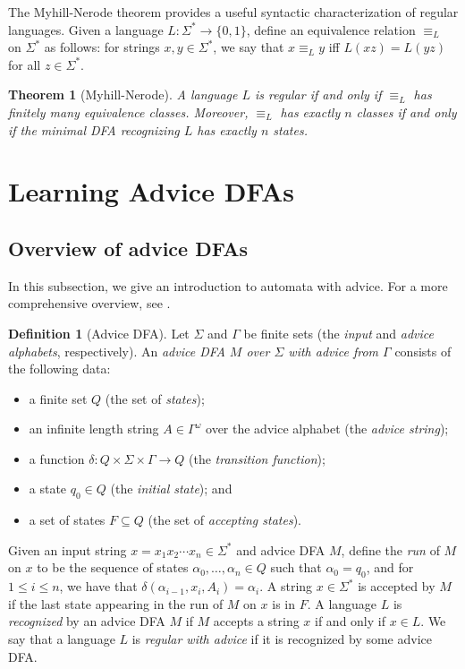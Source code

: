 \documentclass[11pt,a4paper]{amsart}
\newtheorem{theorem}{Theorem}
\theoremstyle{definition}
\newtheorem{definition}{Definition}
\begin{document}
The Myhill-Nerode theorem provides a useful syntactic characterization of regular languages.
Given a language $L : \Sigma^* \to \{0,1\}$, define an equivalence relation $\equiv_L$ on $\Sigma^*$ as follows: for strings $x,y \in \Sigma^*$, we say that $x \equiv_L y$ iff $L(xz)= L(yz)$ for all $z \in \Sigma^*$.

\begin{theorem}[Myhill-Nerode] \label{thm:myhill-nerode}
  A language $L$ is regular if and only if $\equiv_L$ has finitely many equivalence classes.
  Moreover, $\equiv_L$ has exactly $n$ classes if and only if the minimal DFA recognizing $L$ has exactly $n$ states.
\end{theorem}


\section{Learning Advice DFAs} \label{section:complexity of advice DFAs}

\subsection{Overview of advice DFAs}

In this subsection, we give an introduction to automata with advice.
For a more comprehensive overview, see \cite{kruckman-etal:myhill-nerode-automata-advice}.

\begin{definition}[Advice DFA]
  Let $\Sigma$ and $\Gamma$ be finite sets (the \emph{input} and \emph{advice alphabets}, respectively). 
  An \emph{advice DFA $M$ over $\Sigma$ with advice from $\Gamma$} consists of the following data: 
  \begin{itemize}
        \item a finite set $Q$ (the set of \emph{states}); 
        \item an infinite length string $A \in \Gamma^\omega$ over the advice alphabet (the \emph{advice string}); 
        \item a function $\delta : Q \times \Sigma \times \Gamma \to Q$ (the \emph{transition function});
        \item a state $q_0 \in Q$  (the \emph{initial state}); and
        \item a set of states $F \subseteq Q$  (the set of \emph{accepting states}).
  \end{itemize}
\end{definition}

Given an input string $x = x_1 x_2 \cdots x_n \in \Sigma^*$ and advice DFA $M$, define the \emph{run} of $M$ on $x$ to be the sequence of states $\alpha_0, \ldots, \alpha_n \in Q$ such that $\alpha_0 = q_0$, and for $1 \leq i \leq n$, we have that $\delta(\alpha_{i-1}, x_i, A_i) = \alpha_i$. 
A string $x \in \Sigma^*$ is accepted by $M$ if the last state appearing in the run of $M$ on $x$ is in $F$.
A language $L$ is \emph{recognized} by an advice DFA $M$ if $M$ accepts a string $x$ if and only if $x \in L$.
We say that a language $L$ is \emph{regular with advice} if it is recognized by some advice DFA.
\end{document}
